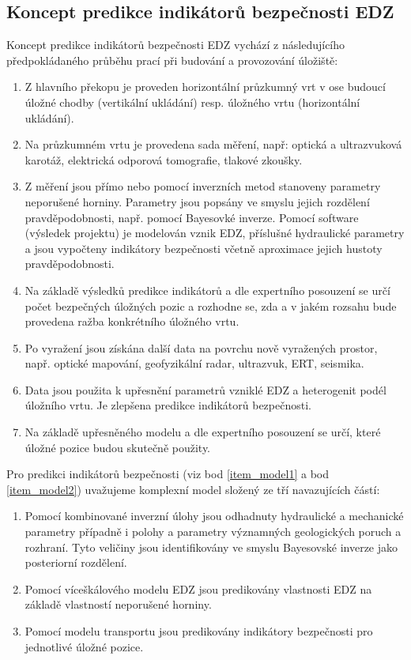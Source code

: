 \documentclass{article}
\begin{document}
\subsection{Koncept predikce indikátorů bezpečnosti EDZ}



Koncept predikce indikátorů bezpečnosti EDZ vychází z následujícího předpokládaného průběhu prací 
při budování a provozování úložiště:
\begin{enumerate}
    \item Z hlavního překopu je proveden horizontální průzkumný vrt v ose budoucí úložné chodby
        (vertikální ukládání) resp. úložného vrtu (horizontální ukládání).
    \item Na průzkumném vrtu je provedena sada měření, 
          např: optická a ultrazvuková karotáž, elektrická odporová tomografie, tlakové zkoušky.

    \item \label{item_model1}
        Z měření jsou přímo nebo pomocí inverzních metod stanoveny parametry neporušené horniny.
        Parametry jsou popsány ve smyslu jejich rozdělení pravděpodobnosti, 
        např. pomocí Bayesovké inverze. Pomocí software (výsledek projektu) je modelován vznik EDZ,
        příslušné hydraulické parametry a jsou vypočteny indikátory bezpečnosti včetně aproximace 
        jejich hustoty pravděpodobnosti.
    \item Na základě výsledků predikce indikátorů a dle expertního posouzení se určí počet bezpečných
        úložných pozic a rozhodne se, zda a v jakém rozsahu bude provedena ražba  konkrétního úložného vrtu.
    \item Po vyražení jsou získána další data na povrchu nově vyražených prostor, např. optické mapování, 
        geofyzikální radar, ultrazvuk, ERT, seismika. 
    \item Data jsou použita k upřesnění parametrů vzniklé EDZ a heterogenit podél úložního vrtu. 
        Je zlepšena predikce indikátorů bezpečnosti.  
    \item \label{item_model2}
        Na základě upřesněného modelu a dle expertního posouzení se určí, které úložné pozice budou 
        skutečně použity.
\end{enumerate}


Pro predikci indikátorů bezpečnosti (viz bod \ref{item_model1} 
a bod \ref{item_model2}) uvažujeme komplexní model složený ze tří navazujících částí: 
    \begin{enumerate}
    \item Pomocí kombinované inverzní úlohy jsou odhadnuty hydraulické a mechanické
     parametry  případně i polohy a parametry významných geologických poruch a rozhraní. 
     Tyto veličiny jsou identifikovány ve smyslu Bayesovské inverze jako posteriorní rozdělení.
    \item Pomocí víceškálového modelu EDZ jsou predikovány vlastnosti EDZ na základě vlastností neporušené horniny.
    \item Pomocí modelu transportu jsou predikovány indikátory bezpečnosti pro jednotlivé úložné pozice.
    \end{enumerate}
\end{document}

